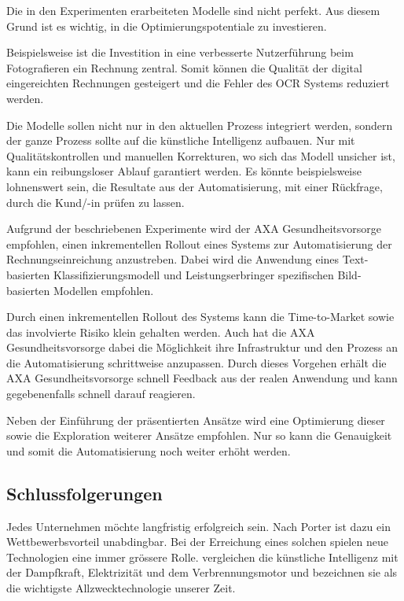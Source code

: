Die in den Experimenten erarbeiteten Modelle sind nicht perfekt. Aus diesem Grund ist es wichtig, in die Optimierungspotentiale zu investieren.

Beispielsweise ist die Investition in eine verbesserte Nutzerführung beim Fotografieren ein Rechnung zentral. Somit können die Qualität der digital eingereichten Rechnungen gesteigert und die Fehler des OCR Systems reduziert werden.

Die Modelle sollen nicht nur in den aktuellen Prozess integriert werden, sondern der ganze Prozess sollte auf die künstliche Intelligenz aufbauen. Nur mit Qualitätskontrollen und manuellen Korrekturen, wo sich das Modell unsicher ist, kann ein reibungsloser Ablauf garantiert werden. Es könnte beispielsweise lohnenswert sein, die Resultate aus der Automatisierung, mit einer Rückfrage, durch die Kund/-in prüfen zu lassen.

Aufgrund der beschriebenen Experimente wird der AXA Gesundheitsvorsorge empfohlen, einen inkrementellen Rollout eines Systems zur Automatisierung der Rechnungseinreichung anzustreben. Dabei wird die Anwendung eines Text-basierten Klassifizierungsmodell und Leistungserbringer spezifischen Bild-basierten Modellen empfohlen.

Durch einen inkrementellen Rollout des Systems kann die Time-to-Market sowie das involvierte Risiko klein gehalten werden. Auch hat die AXA Gesundheitsvorsorge dabei die Möglichkeit ihre Infrastruktur und den Prozess an die Automatisierung schrittweise anzupassen. Durch dieses Vorgehen erhält die AXA Gesundheitsvorsorge schnell Feedback aus der realen Anwendung und kann gegebenenfalls schnell darauf reagieren.

Neben der Einführung der präsentierten Ansätze wird eine Optimierung dieser sowie die Exploration weiterer Ansätze empfohlen. Nur so kann die Genauigkeit und somit die Automatisierung noch weiter erhöht werden.

\subsection{Schlussfolgerungen}

Jedes Unternehmen möchte langfristig erfolgreich sein. Nach Porter ist dazu ein Wettbewerbsvorteil unabdingbar. Bei der Erreichung eines solchen spielen neue Technologien eine immer grössere Rolle. \textcite{McAfee} vergleichen die künstliche Intelligenz mit der Dampfkraft, Elektrizität und dem Verbrennungsmotor und bezeichnen sie als die wichtigste Allzwecktechnologie unserer Zeit.

